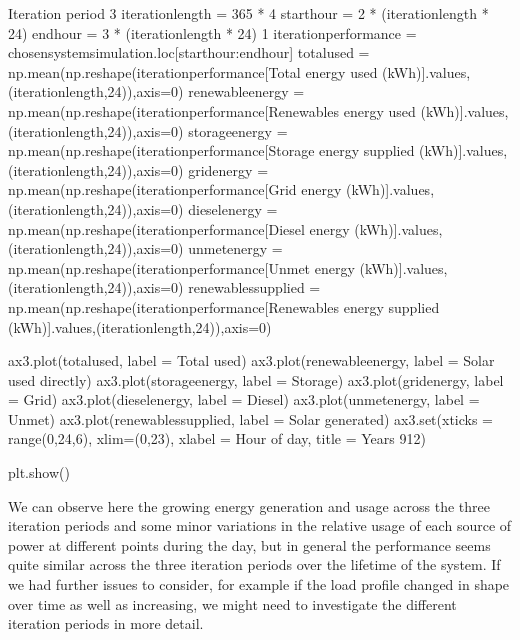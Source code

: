 \documentclass[letterpaper,10pt,english]{sphinxmanual}
\begin{document}
\begin{sphinxVerbatim}[commandchars=\\\{\}]
\PYGZsh{}Iteration period 3
iteration\PYGZus{}length = 365 * 4
start\PYGZus{}hour = 2 * (iteration\PYGZus{}length * 24)
end\PYGZus{}hour = 3 * (iteration\PYGZus{}length * 24) \PYGZhy{} 1
iteration\PYGZus{}performance = chosen\PYGZus{}system\PYGZus{}simulation.loc[start\PYGZus{}hour:end\PYGZus{}hour]
total\PYGZus{}used = np.mean(np.reshape(iteration\PYGZus{}performance[\PYGZsq{}Total energy used (kWh)\PYGZsq{}].values,(iteration\PYGZus{}length,24)),axis=0)
renewable\PYGZus{}energy = np.mean(np.reshape(iteration\PYGZus{}performance[\PYGZsq{}Renewables energy used (kWh)\PYGZsq{}].values,(iteration\PYGZus{}length,24)),axis=0)
storage\PYGZus{}energy = np.mean(np.reshape(iteration\PYGZus{}performance[\PYGZsq{}Storage energy supplied (kWh)\PYGZsq{}].values,(iteration\PYGZus{}length,24)),axis=0)
grid\PYGZus{}energy = np.mean(np.reshape(iteration\PYGZus{}performance[\PYGZsq{}Grid energy (kWh)\PYGZsq{}].values,(iteration\PYGZus{}length,24)),axis=0)
diesel\PYGZus{}energy = np.mean(np.reshape(iteration\PYGZus{}performance[\PYGZsq{}Diesel energy (kWh)\PYGZsq{}].values,(iteration\PYGZus{}length,24)),axis=0)
unmet\PYGZus{}energy = np.mean(np.reshape(iteration\PYGZus{}performance[\PYGZsq{}Unmet energy (kWh)\PYGZsq{}].values,(iteration\PYGZus{}length,24)),axis=0)
renewables\PYGZus{}supplied = np.mean(np.reshape(iteration\PYGZus{}performance[\PYGZsq{}Renewables energy supplied (kWh)\PYGZsq{}].values,(iteration\PYGZus{}length,24)),axis=0)

ax3.plot(total\PYGZus{}used, label = \PYGZsq{}Total used\PYGZsq{})
ax3.plot(renewable\PYGZus{}energy, label = \PYGZsq{}Solar used directly\PYGZsq{})
ax3.plot(storage\PYGZus{}energy, label = \PYGZsq{}Storage\PYGZsq{})
ax3.plot(grid\PYGZus{}energy, label = \PYGZsq{}Grid\PYGZsq{})
ax3.plot(diesel\PYGZus{}energy, label = \PYGZsq{}Diesel\PYGZsq{})
ax3.plot(unmet\PYGZus{}energy, label = \PYGZsq{}Unmet\PYGZsq{})
ax3.plot(renewables\PYGZus{}supplied, label = \PYGZsq{}Solar generated\PYGZsq{})
ax3.set(xticks = range(0,24,6),
        xlim=(0,23),
        xlabel = \PYGZsq{}Hour of day\PYGZsq{},
        title = \PYGZsq{}Years 9\PYGZhy{}12\PYGZsq{})

plt.show()
\end{sphinxVerbatim}

\noindent{}

\sphinxAtStartPar
We can observe here the growing energy generation and usage across the
three iteration periods and some minor variations in the relative usage
of each source of power at different points during the day, but in
general the performance seems quite similar across the three iteration
periods over the lifetime of the system. If we had further issues to
consider, for example if the load profile changed in shape over time as
well as increasing, we might need to investigate the different iteration
periods in more detail.
\end{document}
